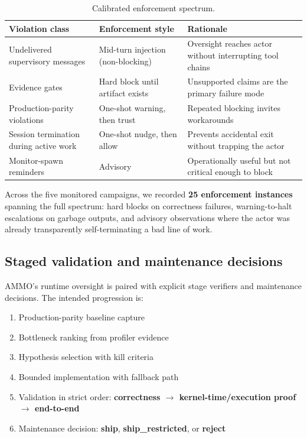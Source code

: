 \documentclass[11pt]{article}
\begin{document}
\begin{table}[h]
\centering
\caption{Calibrated enforcement spectrum.}
\label{tab:enforcement}
\small
\begin{tabularx}{\textwidth}{@{}lll@{}}
\toprule
\textbf{Violation class} & \textbf{Enforcement style} & \textbf{Rationale} \\
\midrule
Undelivered supervisory messages & Mid-turn injection (non-blocking) & Oversight reaches actor without interrupting tool chains \\
Evidence gates & Hard block until artifact exists & Unsupported claims are the primary failure mode \\
Production-parity violations & One-shot warning, then trust & Repeated blocking invites workarounds \\
Session termination during active work & One-shot nudge, then allow & Prevents accidental exit without trapping the actor \\
Monitor-spawn reminders & Advisory & Operationally useful but not critical enough to block \\
\bottomrule
\end{tabularx}
\end{table}

Across the five monitored campaigns, we recorded \textbf{25 enforcement instances} spanning the full spectrum: hard blocks on correctness failures, warning-to-halt escalations on garbage outputs, and advisory observations where the actor was already transparently self-terminating a bad line of work.

\subsection{Staged validation and maintenance decisions}

AMMO's runtime oversight is paired with explicit stage verifiers and maintenance decisions. The intended progression is:

\begin{enumerate}[leftmargin=*,itemsep=2pt]
  \item Production-parity baseline capture
  \item Bottleneck ranking from profiler evidence
  \item Hypothesis selection with kill criteria
  \item Bounded implementation with fallback path
  \item Validation in strict order: \textbf{correctness $\rightarrow$ kernel-time/execution proof $\rightarrow$ end-to-end}
  \item Maintenance decision: \textbf{ship}, \textbf{ship\_restricted}, or \textbf{reject}
\end{enumerate}
\end{document}
